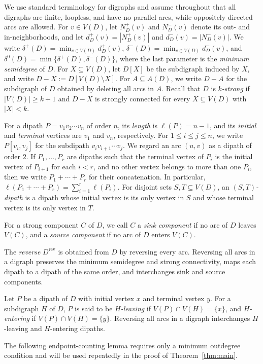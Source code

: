 \documentclass[12pt]{article}
\numberwithin{equation}{section}
\theoremstyle{plain}
\theoremstyle{definition}
\begin{document}
We use standard terminology for digraphs and assume throughout that all digraphs are finite, loopless, and have no parallel arcs, while oppositely directed arcs are allowed.
For $v\in V(D)$, let $N_D^+(v)$ and $N_D^-(v)$ denote its out- and in-neighborhoods, and let $d_D^+(v)=|N_D^+(v)|$ and $d_D^-(v)=|N_D^-(v)|$.
We write $\delta^+(D)=\min_{v\in V(D)}d_D^+(v)$, $\delta^-(D)=\min_{v\in V(D)}d_D^-(v)$, and $\delta^0(D)=\min\{\delta^+(D),\delta^-(D)\}$, where the last parameter is the \emph{minimum semidegree} of $D$.
For $X\subseteq V(D)$, let $D[X]$ be the subdigraph induced by $X$, and write $D-X:=D[V(D)\setminus X]$.
For $A\subseteq A(D)$, we write $D-A$ for the subdigraph of $D$ obtained by deleting all arcs in $A$.
Recall that $D$ is \emph{$k$-strong} if $|V(D)|\ge k+1$ and $D-X$ is strongly connected for every $X\subseteq V(D)$ with $|X|<k$.

For a dipath $P=v_1v_2\cdots v_n$ of order $n$, its \emph{length} is $\ell(P)=n-1$, and its \emph{initial} and \emph{terminal} vertices are $v_1$ and $v_n$, respectively.
For $1\le i\le j\le n$, we write $P[v_i,v_j]$ for the subdipath $v_i v_{i+1}\cdots v_j$.
We regard an arc $(u,v)$ as a dipath of order $2$.
If $P_1,\ldots,P_r$ are dipaths such that the terminal vertex of $P_i$ is the initial vertex of $P_{i+1}$ for each $i<r$, and no other vertex belongs to more than one $P_i$, then we write $P_1+\cdots+P_r$ for their concatenation. In particular, $\ell(P_1+\cdots+P_r)=\sum_{i=1}^r\ell(P_i)$.
For disjoint sets $S,T\subseteq V(D)$, an \emph{$(S,T)$-dipath} is a dipath whose initial vertex is its only vertex in $S$ and whose terminal vertex is its only vertex in $T$.

For a strong component $C$ of $D$, we call $C$ a \emph{sink component} if no arc of $D$ leaves $V(C)$, and a \emph{source component} if no arc of $D$ enters $V(C)$. 

The \emph{reverse} $D^{\mathrm{rev}}$ is obtained from $D$ by reversing every arc.
Reversing all arcs in a digraph preserves the minimum semidegree and strong connectivity, maps each dipath to a dipath of the same order, and interchanges sink and source components.

Let $P$ be a dipath of $D$ with initial vertex $x$ and terminal vertex $y$.
For a subdigraph $H$ of $D$, $P$ is said to be \emph{$H$-leaving} if $V(P)\cap V(H)=\{x\}$, and \emph{$H$-entering} if $V(P)\cap V(H)=\{y\}$.
Reversing all arcs in a digraph interchanges $H$-leaving and $H$-entering dipaths.

The following endpoint-counting lemma requires only a minimum outdegree condition and will be used repeatedly in the proof of Theorem~\ref{thm:main}.
\end{document}
